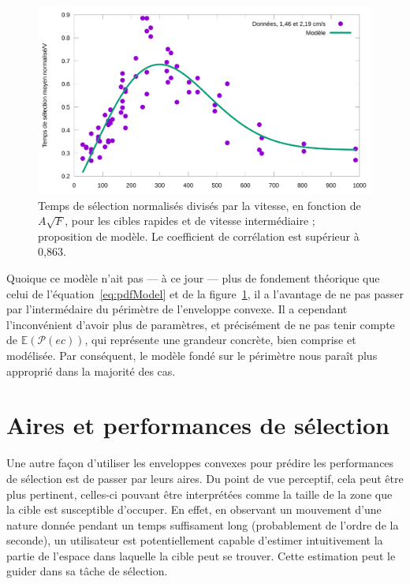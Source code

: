 	\begin{figure}[!htbp]
		\centering
		\includegraphics[width=\textwidth]{figures/ch4/timeVafFit}
		\caption[Temps de sélection/V en fonction de $A\sqrt{F}$ et modèle]{Temps de sélection normalisés divisés par la vitesse, en fonction de $A\sqrt{F}$, pour les cibles rapides et de vitesse intermédiaire ; proposition de modèle. Le coefficient de corrélation est supérieur à 0,863.}
		\label{fig:timeVafFit}
	\end{figure}
	

	
	Quoique ce modèle n'ait pas --- à ce jour --- plus de fondement théorique que celui de l'équation~\ref{eq:pdfModel} et de la figure~\ref{fig:timeVafFit}, il a l'avantage de ne pas passer par l'intermédaire du périmètre de l'enveloppe convexe. Il a cependant l'inconvénient d'avoir plus de paramètres, et précisément de ne pas tenir compte de $\mathbb{E}(\mathcal{P}(ec))$, qui représente une grandeur concrète, bien comprise et modélisée. Par conséquent, le modèle fondé sur le périmètre nous paraît plus approprié dans la majorité des cas.
	
\section{Aires et performances de sélection}
	Une autre façon d'utiliser les enveloppes convexes pour prédire les performances de sélection est de passer par leurs aires. Du point de vue perceptif, cela peut être plus pertinent, celles-ci pouvant être interprétées comme la taille de la zone que la cible est susceptible d'occuper. En effet, en observant un mouvement d'une nature donnée pendant un temps suffisament long (probablement de l'ordre de la seconde), un utilisateur est potentiellement capable d'estimer intuitivement la partie de l'espace dans laquelle la cible peut se trouver.	Cette estimation peut le guider dans sa tâche de sélection.
	
